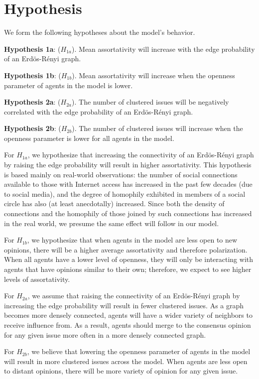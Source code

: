 \section{Hypothesis}
We form the following hypotheses about the model's behavior.

\textbf{Hypothesis 1a}: ($H_{1a}$). Mean assortativity will increase with the
edge probability of an Erd\"{o}s-R\'{e}nyi graph.

\textbf{Hypothesis 1b}: ($H_{1b}$). Mean assortativity will increase when the
openness parameter of agents in the model is lower.

\textbf{Hypothesis 2a}: ($H_{2a}$). The number of clustered issues will be
negatively correlated with the edge probability of an Erd\"{o}s-R\'{e}nyi
graph.

\textbf{Hypothesis 2b}: ($H_{2b}$). The number of clustered issues will
increase when the openness parameter is lower for all agents in the model.


For $H_{1a}$, we hypothesize that increasing the connectivity of an
Erd\"o{s}-R\'{e}nyi graph by raising the edge probability will result in higher
assortativity. This hypothesis is based mainly on real-world observations: the
number of social connections available to those with Internet access has
increased in the past few decades (due to social media\cite{dean_how_2021}),
and the degree of homophily exhibited in members of a social circle has also
(at least anecdotally) increased. Since both the density of connections and the
homophily of those joined by such connections has increased in the real world,
we presume the same effect will follow in our model.

For $H_{1b}$, we hypothesize that when agents in the model are less open to new
opinions, there will be a higher average assortativity and therefore
polarization. When all agents have a lower level of openness, they will only be
interacting with agents that have opinions similar to their own; therefore, we
expect to see higher levels of assortativity. 

For $H_{2a}$, we assume that raising the connectivity of an Erd\"o{s}-R\'{e}nyi
graph by increasing the edge probability will result in fewer clustered issues.
As a graph becomes more densely connected, agents will have a wider variety of
neighbors to receive influence from. As a result, agents should merge to the
consensus opinion for any given issue more often in a more densely connected
graph. 

For $H_{2b}$, we believe that lowering the openness parameter of agents in the
model will result in more clustered issues across the model. When agents are
less open to distant opinions, there will be more variety of opinion for any
given issue. 
